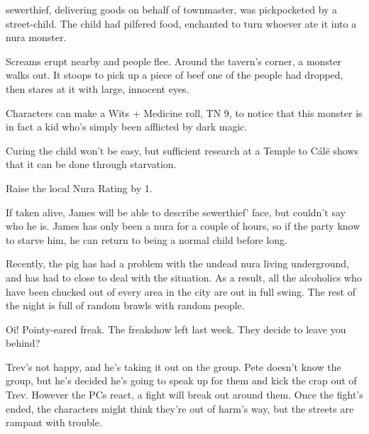 \begin{multicols}{2}
\Gls{sewerthief}, delivering goods on behalf of \gls{townmaster}, was pickpocketed by a street-child.
The child had pilfered food, enchanted to turn whoever ate it into a nura monster.

\begin{boxtext}

	Screams erupt nearby and people flee.
	Around the tavern's corner, a monster walks out.
	It stoops to pick up a piece of beef one of the people had dropped, then stares at it with large, innocent eyes.

\end{boxtext}

Characters can make a Wits + Medicine roll, TN 9, to notice that this monster is in fact a kid who's simply been afflicted by dark magic.

Curing the child won't be easy, but sufficient research at a Temple to C\'{a}l\"{e} shows that it can be done through starvation.

Raise the local Nura Rating by 1.


\deephobgoblin

If taken alive, James will be able to describe \gls{sewerthief}' face, but couldn't say who he is.
James has only been a nura for a couple of hours, so if the party know to starve him, he can return to being a normal child before long.


Recently, the \gls{pig} has had a problem with the undead nura living underground, and has had to close to deal with the situation.
As a result, all the alcoholics who have been chucked out of every area in the city are out in full swing.
The rest of the night is full of random brawls with random people.

\begin{boxtext}

	Oi! Pointy-eared freak.  The freakshow left last week.  They decide to leave you behind?

\end{boxtext}

Trev's not happy, and he's taking it out on the group.
Pete doesn't know the group, but he's decided he's going to speak up for them and kick the crap out of Trev.
However the PCs react, a fight will break out around them.
Once the fight's ended, the characters might think they're out of harm's way, but the streets are rampant with trouble.


\end{multicols}
